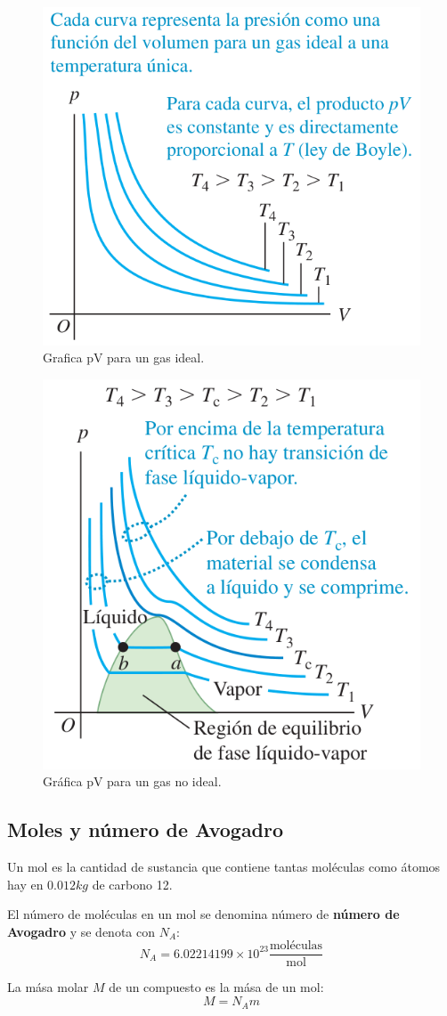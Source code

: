 \documentclass[12pt]{article}
\begin{document}
  \begin{figure}[H]
    \centering
    \includegraphics[width=0.5\linewidth]{imagenes/g-pv-gas-ideal.png}
    \caption{Grafica pV para un gas ideal.}
    \label{fig:pv-gas-ideal}
  \end{figure}
  
  \begin{figure}[H]
    \centering
    \includegraphics[width=0.5\linewidth]{imagenes/g-pv-gas-no-ideal.png}
    \caption{Gráfica pV para un gas no ideal.}
    \label{fig:pv-gas-no-ideal}
  \end{figure}

  \subsection{Moles y número de Avogadro}
  Un mol es la cantidad de sustancia que contiene tantas moléculas como átomos hay en $ 0.012kg $ de carbono 12.

  El número de moléculas en un mol se denomina número de \textbf{número de Avogadro} y se denota con $ N_{A} $:
  \[
  N_{A} = 6.02214199\times 10^{23}\frac{\text{moléculas}}{\text{mol}}
  \]

  La mása molar $ M $ de un compuesto es la mása de un mol:
  \[
  M = N_{A}m
  \]
\end{document}
